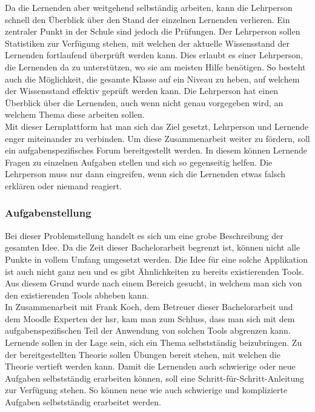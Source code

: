 Da die Lernenden aber weitgehend selbständig arbeiten, kann die Lehrperson schnell den Überblick über den Stand der einzelnen Lernenden verlieren. Ein zentraler Punkt in der Schule sind jedoch die Prüfungen. Der Lehrperson sollen Statistiken zur Verfügung stehen, mit welchen der aktuelle Wissensstand der Lernenden fortlaufend überprüft werden kann. Dies erlaubt es einer Lehrperson, die Lernenden da zu unterstützen, wo sie am meisten Hilfe benötigen. So besteht auch die Möglichkeit, die gesamte Klasse auf ein Niveau zu heben, auf welchem der Wissensstand effektiv geprüft werden kann. Die Lehrperson hat einen Überblick über die Lernenden, auch wenn nicht genau vorgegeben wird, an welchem Thema diese arbeiten sollen. \\

Mit dieser Lernplattform hat man sich das Ziel gesetzt, Lehrperson und Lernende enger miteinander zu verbinden. Um diese Zusammenarbeit weiter zu fördern, soll ein aufgabenspezifisches Forum bereitgestellt werden. In diesem können Lernende Fragen zu einzelnen Aufgaben stellen und sich so gegenseitig helfen. Die Lehrperson muss nur dann eingreifen, wenn sich die Lernenden etwas falsch erklären oder niemand reagiert.

\subsubsection{Aufgabenstellung}
Bei dieser Problemstellung handelt es sich um eine grobe Beschreibung der gesamten Idee. Da die Zeit dieser Bachelorarbeit begrenzt ist, können nicht alle Punkte in vollem Umfang umgesetzt werden. Die Idee für eine solche Applikation ist auch nicht ganz neu und es gibt Ähnlichkeiten zu bereits existierenden Tools. Aus diesem Grund wurde nach einem Bereich gesucht, in welchem man sich von den existierenden Tools abheben kann. \\

In Zusammenarbeit mit Frank Koch, dem Betreuer dieser Bachelorarbeit und dem Moodle Experten der \gls{hsr}, kam man zum Schluss, dass man sich mit dem aufgabenspezifischen Teil der Anwendung von solchen Tools abgrenzen kann. Lernende sollen in der Lage sein, sich ein Thema selbstständig beizubringen. Zu der bereitgestellten Theorie sollen Übungen bereit stehen, mit welchen die Theorie vertieft werden kann. Damit die Lernenden auch schwierige oder neue Aufgaben selbstständig erarbeiten können, soll eine Schritt-für-Schritt-Anleitung zur Verfügung stehen. So können neue wie auch schwierige und komplizierte Aufgaben selbstständig erarbeitet werden.

